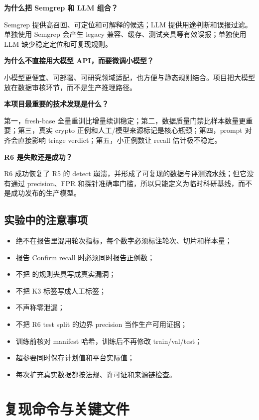 \documentclass[UTF8,11pt,fontset=none]{ctexart}
\newcommand{\code}[1]{\texttt{\detokenize{#1}}}
\begin{document}
\textbf{为什么把 Semgrep 和 LLM 组合？}

Semgrep 提供高召回、可定位和可解释的候选；LLM 提供用途判断和误报过滤。单独使用 Semgrep 会产生 legacy 兼容、缓存、测试夹具等有效误报；单独使用 LLM 缺少稳定定位和可复现规则。

\textbf{为什么不直接用大模型 API，而要微调小模型？}

小模型更便宜、可部署、可研究领域适配，也方便与静态规则结合。项目把大模型放在数据审核环节，而不是生产推理路径。

\textbf{本项目最重要的技术发现是什么？}

第一，fresh-base 全量重训比增量续训稳定；第二，数据质量门禁比样本数量更重要；第三，真实 crypto 正例和人工/模型来源标记是核心瓶颈；第四，prompt 对齐会直接影响 triage verdict；第五，小正例数让 recall 估计极不稳定。

\textbf{R6 是失败还是成功？}

R6 成功恢复了 R5 的 detect 崩溃，并形成了可复现的数据与评测流水线；但它没有通过 precision、FPR 和探针准确率门槛，所以只能定义为临时科研基线，而不是成功发布的生产模型。

\subsection{实验中的注意事项}

\begin{itemize}
  \item 绝不在报告里混用轮次指标，每个数字必须标注轮次、切片和样本量；
  \item 报告 Confirm recall 时必须同时报告正例数；
  \item 不把 \code{verified=false} 的规则夹具写成真实漏洞；
  \item 不把 K3 标签写成人工标签；
  \item 不声称零泄漏；
  \item 不把 R6 test split 的边界 precision 当作生产可用证据；
  \item 训练前核对 manifest 哈希，训练后不再修改 train/val/test；
  \item 超参要同时保存计划值和平台实际值；
  \item 每次扩充真实数据都按法规、许可证和来源链检查。
\end{itemize}

\appendix

\section{复现命令与关键文件}
\end{document}
